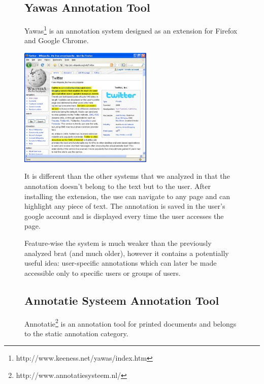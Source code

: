 \documentclass[a4paper, 12pt, notitlepage]{report}
\begin{document}
\begin{figure}[ht]
\subsection{Yawas Annotation Tool} %
Yawas\footnote{http://www.keeness.net/yawas/index.htm} is an annotation system designed as an extension for Firefox and Google Chrome.\\[0.1in]
\begin{center}
\includegraphics[width=2.5in]{yawas.jpg}
\end{center}
It is different than the other systems that we analyzed in that the annotation doesn't
belong to the text but to the user. After installing the extension, the use can navigate
to any page and can highlight any piece of text. The annotation is saved in the user's
google account and is displayed every time the user accesses the page.\vspace{10pt}

Feature-wise the system is much weaker than the previously analyzed brat (and much older),
however it contains a potentially useful idea: user-specific annotations which can later
be made accessible only to specific users or groups of users.



\subsection{Annotatie Systeem Annotation Tool} %
Annotatie\footnote{http://www.annotatiesysteem.nl/} is an annotation tool for printed
documents and belongs to the static annotation category.\vspace{10pt}


\end{figure}
\end{document}
